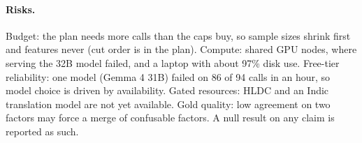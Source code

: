 \paragraph{Risks.} Budget: the plan needs more calls than the caps buy, so sample sizes shrink first and features never (cut order is in the plan). Compute: shared GPU nodes, where serving the 32B model failed, and a laptop with about 97\% disk use. Free-tier reliability: one model (Gemma 4 31B) failed on 86 of 94 calls in an hour, so model choice is driven by availability. Gated resources: HLDC and an Indic translation model are not yet available. Gold quality: low agreement on two factors may force a merge of confusable factors. A null result on any claim is reported as such.
